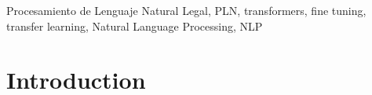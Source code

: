\documentclass[onecolumn, journal, english, 12pt, a4paper]{IEEEtran} %
\newcommand{\printnombrecomision}{Comisión Especial de Estadística de
  Seguridad, Justicia, Crimen y Transparencia}
\theoremstyle{definition}
\begin{document}
\begin{abstract}
    
\end{abstract}

\begin{IEEEkeywords}
Procesamiento de Lenguaje Natural Legal, PLN, transformers, fine tuning, transfer learning, Natural Language Processing, NLP
\end{IEEEkeywords}






%
\IEEEpeerreviewmaketitle



\section{Introduction}
% 
% 
% 
% 
\end{document}
